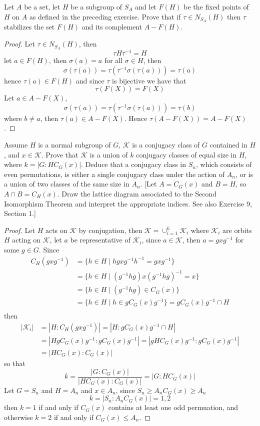 \documentclass{article}
\newenvironment{problem}[2][Problem]{\begin{trivlist}
\item[\hskip \labelsep {\bfseries #1}\hskip \labelsep {\bfseries #2.}]}{\end{trivlist}}
\begin{document}
\begin{problem}{18}
   Let $A$ be a set, let $H$ be a subgroup of $S_A$ and let $F(H)$ be the fixed points of $H$ on $A$ as defined in the preceding exercise. Prove that if $\tau \in N_{S_A}(H)$ then $\tau$ stabilizes the set $F(H)$ and its complement $A - F(H)$.
\end{problem}
\begin{proof}
    Let $\tau \in N_{S_A}(H)$, then 
    \[
    \tau H \tau^{-1}= H
    \]
    let $a\in F(H)$, then $\sigma(a)=a$ for all $\sigma \in H$, then
    \[
    \sigma(\tau (a))=\tau( \tau^{-1}\sigma(\tau(a)) ) = \tau(a)
    \]
    hence $\tau(a) \in F(H)$ and since $\tau$ is bijective we have that 
    \[
        \tau (F(X)) =F(X)
    \]
    Let $a \in A-F(X)$, 
    \[
        \sigma(\tau (a))=\tau( \tau^{-1}\sigma(\tau(a)) ) = \tau(b)
    \]
    where $b \neq a$, then $\tau(a)\in A-F(X)$. Hence $\tau(A-F(X))=A-F(X)$.
\end{proof}
\begin{problem}{19}
    Assume \( H \) is a normal subgroup of \( G \), \( \mathcal{K} \) is a conjugacy class of \( G \) contained in \( H \), and \( x \in \mathcal{K} \). Prove that \( \mathcal{K} \) is a union of \( k \) conjugacy classes of equal size in \( H \), where \( k = |G : H C_G(x)| \). Deduce that a conjugacy class in \( S_n \), which consists of even permutations, is either a single conjugacy class under the action of \( A_n \), or is a union of two classes of the same size in \( A_n \). [Let \( A = C_G(x) \) and \( B = H \), so \( A \cap B = C_H(x) \). Draw the lattice diagram associated to the Second Isomorphism Theorem and interpret the appropriate indices. See also Exercise 9, Section 1.]
\end{problem}
\begin{proof}
    Let $H$ acts on $\mathcal{K}$ by conjugation, then $\mathcal{K}=\cup_{i=1}^k\mathcal{K}_i$ where $\mathcal{K}_i$ are orbits $H$ acting on $\mathcal{K}$, let $a$ be representative of $\mathcal{K}_i$, since $a \in \mathcal{K}$, then $a=gxg^{-1}$ for some $g \in G$. Since
    \begin{align*}
    C_H(gxg^{-1})&=\{h \in H \mid hgxg^{-1}h^{-1}=gxg^{-1}\}\\
    &=\{h \in H\mid (g^{-1}hg)x(g^{-1}hg)^{-1}=x\}\\
    &=\{h \in H\mid (g^{-1}hg)\in C_G(x)\}\\
    &=\{h \in H\mid h\in gC_G(x)g^{-1}\}=gC_G(x)g^{-1}\cap H\\
    \end{align*}
    then 
    \begin{align*}
    |\mathcal{K}_i| &= |H:C_H(gxg^{-1})| = |H:gC_G(x)g^{-1}\cap H|\\
    &= |HgC_G(x)g^{-1}:gC_G(x)g^{-1}| = |gHC_G(x)g^{-1}:gC_G(x)g^{-1}|\\
    & =|HC_G(x):C_G(x)|
    \end{align*}
    so that 
    \[
        k =\frac{|G:C_G(x)|}{|HC_G(x):C_G(x)|}=|G:HC_G(x)|
    \]
    Let $G=S_n$ and $H=A_n$ and $x \in A_n$, since $S_n\geq A_nC_G(x)\geq A_n$
    \[
    k=|S_n:A_nC_G(x)|=1,2 
    \]
    then $k=1$ if and only if $C_G(x)$ contains at least one odd permuation, and otherwise $k=2$ if and only if $C_G(x)\leq A_n$.
\end{proof}
\end{document}
